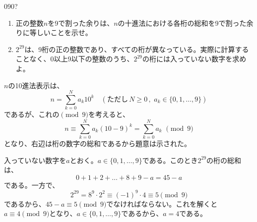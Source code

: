 \begin{thm}{090}{\hosi ?}{}
 \begin{enumerate}
  \item 正の整数$n$を9で割った余りは、$n$の十進法における各桁の総和を9で割った余りに等しいことを示せ。
  \item $2^{29}$は、9桁の正の整数であり、すべての桁が異なっている。実際に計算することなく、0以上9以下の整数のうち、$2^{29}$の桁には入っていない数字を求めよ。
 \end{enumerate}
\end{thm}

$n$の10進法表示は、
\[ n=\sum_{k=0}^N a_k 10^k \quad(\text{ただし}\, N\ge 0 \,,\,\, a_k\in\{0, 1, \dots, 9\}) \]
であるが、これの$\pmod{9}$を考えると、
\[ n\equiv \sum_{k=0}^N a_k(10-9)^k=\sum_{k=0}^N a_k \,\,\pmod{9} \]
となり、右辺は桁の数字の総和であるから題意は示された。

入っていない数字を$a$とおく。$a\in\{0, 1, \dots, 9\}$である。このとき$2^{29}$の桁の総和は、
\[ 0+1+2+\dots+8+9-a=45-a \]
である。一方で、
\[ 2^{29}=8^9\cdot2^2\equiv (-1)^9\cdot 4\equiv 5 \pmod{9} \]
であるから、$45-a\equiv 5 \pmod{9}$でなければならない。これを解くと$a\equiv 4 \pmod{9}$となり、$a\in\{0, 1, \dots, 9\}$であるから、$a=4$である。